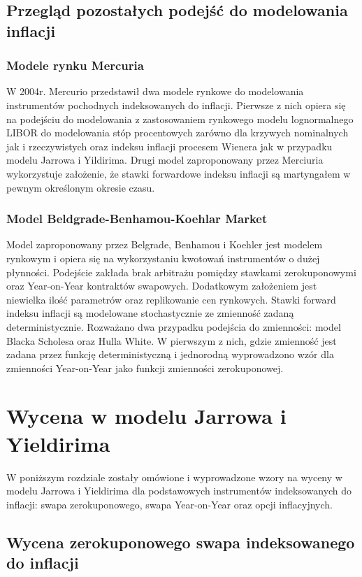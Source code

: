 \documentclass{mini}
\theoremstyle{mythstyle}
\begin{document}
	\pagebreak
\section{Przegląd pozostałych podejść do modelowania inflacji}
\subsection{Modele rynku Mercuria}
W 2004r. Mercurio przedstawił dwa modele rynkowe do modelowania instrumentów pochodnych indeksowanych do inflacji.  Pierwsze z nich opiera się na  podejściu do modelowania z zastosowaniem rynkowego modelu lognormalnego LIBOR do modelowania stóp procentowych zarówno dla krzywych nominalnych jak i rzeczywistych oraz indeksu inflacji procesem Wienera jak w przypadku modelu Jarrowa i Yildirima. Drugi model zaproponowany przez Merciuria wykorzystuje założenie, że stawki forwardowe indeksu inflacji są martyngałem w pewnym określonym okresie czasu.



\subsection{Model Beldgrade-Benhamou-Koehlar Market}	
Model zaproponowany przez Belgrade, Benhamou i Koehler jest modelem rynkowym i opiera się na wykorzystaniu kwotowań instrumentów o dużej płynności. Podejście zakłada brak arbitrażu pomiędzy stawkami zerokuponowymi oraz Year-on-Year kontraktów swapowych. Dodatkowym założeniem jest niewielka ilość parametrów oraz replikowanie cen rynkowych. Stawki forward indeksu inflacji są modelowane stochastycznie ze zmienność zadaną deterministycznie. Rozważano dwa przypadku podejścia do zmienności: model Blacka Scholesa oraz Hulla White. W pierwszym z nich, gdzie zmienność jest zadana przez funkcję deterministyczną i jednorodną wyprowadzono wzór dla zmienności Year-on-Year jako funkcji zmienności zerokuponowej.



	\chapter{Wycena w modelu Jarrowa i Yieldirima}
	
	W poniższym rozdziale zostały omówione i wyprowadzone wzory na wyceny w modelu Jarrowa i Yieldirima dla podstawowych instrumentów indeksowanych do inflacji: swapa zerokuponowego, swapa Year-on-Year oraz opcji inflacyjnych.
		
	\section{Wycena zerokuponowego swapa indeksowanego do inflacji}
	
\end{document}
